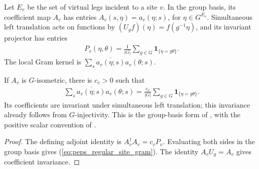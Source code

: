 \begin{definition}%
    \label{def:peps_regular_site_gram}
    \leanok
    Let $E_v$ be the set of virtual legs incident to a site $v$.
    In the group basis, its coefficient map $A_v$ has entries
    $A_v(s,\eta)=a_v(\eta;s)$, for $\eta\in G^{E_v}$.
    Simultaneous left translation acts on functions by
    $(U_gf)(\eta)=f(g^{-1}\eta)$, and its invariant projector has entries
    \begin{align}
        P_v(\eta,\theta)=\frac1{|G|}\sum_{g\in G}
        \mathbf 1_{\{\eta=g\theta\}}.
    \end{align}
    The local Gram kernel is
    $\sum_s\overline{a_v(\eta;s)}a_v(\theta;s)$.
\end{definition}

\begin{lemma}%
    \label{thm:peps_regular_site_gram}
    \leanok
    If $A_v$ is $G$-isometric, there is $c_v>0$ such that
    \begin{align}
        \sum_s\overline{a_v(\eta;s)}a_v(\theta;s)
        =\frac{c_v}{|G|}\sum_{g\in G}
        \mathbf 1_{\{\eta=g\theta\}}.
        \label{eq:peps_regular_site_gram}
    \end{align}
    Its coefficients are invariant under simultaneous left translation;
    this invariance already follows from $G$-injectivity.
    This is the group-basis form of
    \cite[Definition~6.1]{Schuch2010PEPS}, with the positive scalar
    convention of \cite{gap:rmp_peps_quantum_double_g_isometry}.
\end{lemma}
\begin{proof}\leanok
    The defining adjoint identity is $A_v^\dagger A_v=c_vP_v$.
    Evaluating both sides in the group basis gives
    (\ref{eq:peps_regular_site_gram}).
    The identity $A_vU_g=A_v$ gives coefficient invariance.
\end{proof}

